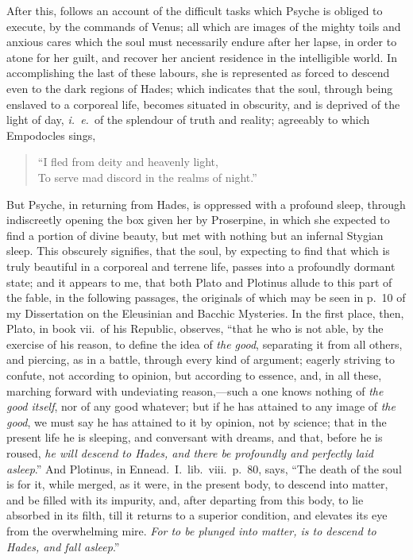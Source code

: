 \documentclass[12pt]{article}
\begin{document}
{After this, follows an account of the difficult tasks which Psyche is obliged
to execute, by the commands of Venus; all which are images of the mighty toils
and anxious cares which the soul must necessarily endure after her lapse, in
order to atone for her guilt, and recover her ancient residence in the
intelligible world. In accomplishing the last of these labours, she is
represented as forced to descend even to the dark regions of Hades; which
indicates that the soul, through being enslaved to a corporeal life, becomes
situated in obscurity, and is deprived of the light of day, \textit{i.~e.}~of
the splendour of truth and reality; agreeably to which Empodocles sings,

\begin{verse}
``I fled from deity and heavenly light,\\
To serve mad discord in the realms of night.''
\end{verse}

\noindent But Psyche, in returning from Hades, is oppressed with a profound
sleep, through indiscreetly opening the box given her by Proserpine, in which
she expected to find a portion of divine beauty, but met with nothing but an
infernal Stygian sleep. This obscurely signifies, that the soul, by expecting
to find that which is truly beautiful in a corporeal and terrene life, passes
into a profoundly dormant state; and it appears to me, that both Plato and
Plotinus allude to this part of the fable, in the following passages, the
originals of which may be seen in p.~10 of my Dissertation on the Eleusinian
and Bacchic Mysteries. In the first place, then, Plato, in book vii.~of his
Republic, observes, ``that he who is not able, by the exercise of his reason,
to define the idea of \textit{the good}, separating it from all others, and
piercing, as in a battle, through every kind of argument; eagerly striving to
confute, not according to opinion, but according to essence, and, in all these,
marching forward with undeviating reason,---such a one knows nothing of
\textit{the good itself}, nor of any good whatever; but if he has attained to
any image of \textit{the good}, we must say he has attained to it by opinion,
not by science; that in the present life he is sleeping, and conversant with
dreams, and that, before he is roused, \textit{he will descend to Hades, and
there be profoundly and perfectly laid asleep}.'' And Plotinus, in
Ennead.~I.~lib.~viii.~p.~80, says, ``The death of the soul is for it, while
merged, as it were, in the present body, to descend into matter, and be filled
with its impurity, and, after departing from this body, to lie absorbed in its
filth, till it returns to a superior condition, and elevates its eye from the
overwhelming mire. \textit{For to be plunged into matter, is to descend to
Hades, and fall asleep}.''

}
\end{document}
